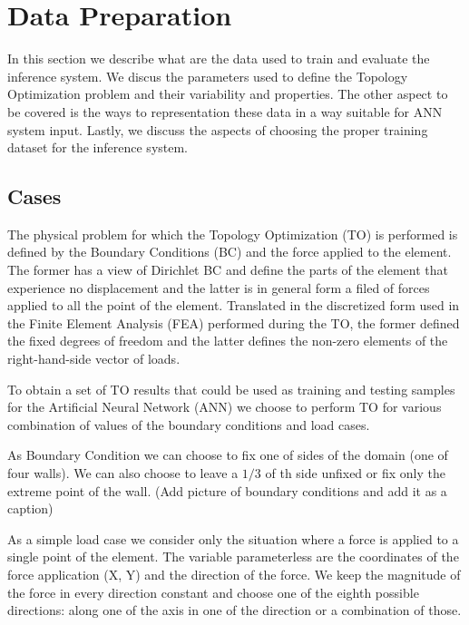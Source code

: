 


\section{Data Preparation}

In this section we describe what are the data used to train and evaluate the inference system.
We discus the parameters used to define the Topology Optimization problem and their variability and properties.
The other aspect to be covered is the ways to representation these data in a way suitable for ANN system input.
Lastly, we discuss the aspects of choosing the proper training dataset for the inference system.

\subsection{Cases}

The physical problem for which the Topology Optimization (TO) is performed is defined by the Boundary Conditions (BC) and the force applied to the element. 
The former has a view of Dirichlet BC and define the parts of the element that experience no displacement and the latter is in general form a filed of forces applied to all the point of the element. 
Translated in the discretized form used in the Finite Element Analysis (FEA) performed during the TO, the former defined the fixed degrees of freedom and the latter defines the non-zero elements of the right-hand-side vector of loads.
\medskip

To obtain a set of TO results that could be used as training and testing samples for the Artificial Neural Network (ANN) we choose to perform TO for various combination of values of the boundary conditions and load cases.
\medskip

As Boundary Condition we can choose to fix one of sides of the domain (one of four walls). 
We can also choose to leave a ${1/3}$ of th side unfixed or fix only the extreme point of the wall. (Add picture of boundary conditions and add it as a caption)
\medskip

As a simple load case we consider only the situation where a force is applied to a single point of the element. 
The variable parameterless are the coordinates of the force application (X, Y) and the direction of the force.
We keep the magnitude of the force in every direction constant and choose one of the eighth possible directions: along one of the axis in one of the direction or a combination of those.
\medskip

